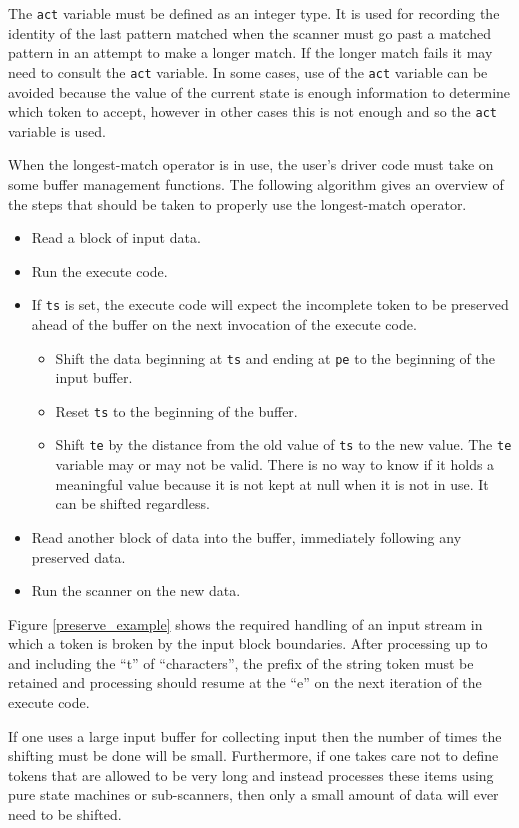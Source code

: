\documentclass[letterpaper,11pt,oneside]{book}
\begin{document}
The \verb|act| variable must be defined as an integer type. It is used for
recording the identity of the last pattern matched when the scanner must go
past a matched pattern in an attempt to make a longer match. If the longer
match fails it may need to consult the \verb|act| variable. In some cases, use 
of the \verb|act|
variable can be avoided because the value of the current state is enough
information to determine which token to accept, however in other cases this is
not enough and so the \verb|act| variable is used. 

When the longest-match operator is in use, the user's driver code must take on
some buffer management functions. The following algorithm gives an overview of
the steps that should be taken to properly use the longest-match operator.

\begin{itemize}
\item Read a block of input data.
\item Run the execute code.
\item If \verb|ts| is set, the execute code will expect the incomplete
token to be preserved ahead of the buffer on the next invocation of the execute
code.  
\begin{itemize}
\item Shift the data beginning at \verb|ts| and ending at \verb|pe| to the
beginning of the input buffer.
\item Reset \verb|ts| to the beginning of the buffer. 
\item Shift \verb|te| by the distance from the old value of \verb|ts|
to the new value. The \verb|te| variable may or may not be valid.  There is
no way to know if it holds a meaningful value because it is not kept at null
when it is not in use. It can be shifted regardless.
\end{itemize}
\item Read another block of data into the buffer, immediately following any
preserved data.
\item Run the scanner on the new data.
\end{itemize}

Figure \ref{preserve_example} shows the required handling of an input stream in
which a token is broken by the input block boundaries. After processing up to
and including the ``t'' of ``characters'', the prefix of the string token must be
retained and processing should resume at the ``e'' on the next iteration of
the execute code.

If one uses a large input buffer for collecting input then the number of times
the shifting must be done will be small. Furthermore, if one takes care not to
define tokens that are allowed to be very long and instead processes these
items using pure state machines or sub-scanners, then only a small amount of
data will ever need to be shifted.
\end{document}
